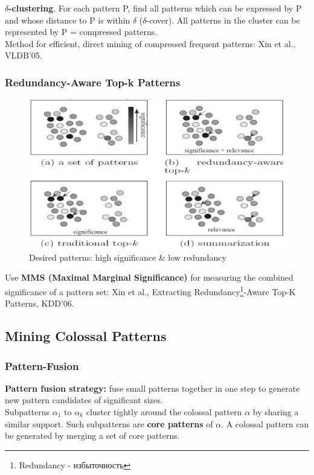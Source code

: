 \textbf{$\delta$-clustering}. For each pattern P, find all patterns which can be expressed by P and whose distance to P is within $\delta$ ($\delta$-cover). All patterns in the cluster can be represented by P = compressed patterns.\\

Method for efficient, direct mining of compressed frequent patterns: Xin et al., VLDB’05.\\

\subsubsection{Redundancy-Aware Top-k Patterns}
\begin{figure}[h]
    \centering
    \includegraphics[width=\linewidth]{desired_patterns.png}
    \caption{Desired patterns: high significance \& low redundancy}
\end{figure}

Use \textbf{MMS (Maximal Marginal Significance)} for measuring the combined significance of a pattern set: Xin et al., Extracting Redundancy\footnote{Redundancy - избыточность}-Aware Top-K Patterns, KDD’06.

\subsection{Mining Colossal Patterns}
\subsubsection{Pattern-Fusion}
\textbf{Pattern fusion strategy:} fuse small patterns together in one step to generate new pattern candidates of significant sizes.\\

Subpatterns $\alpha_1$ to $\alpha_k$ cluster tightly around the colossal pattern $\alpha$ by sharing a similar support. Such subpatterns are \textbf{core patterns} of $\alpha$. A colossal pattern can be generated by merging a set of core patterns.

